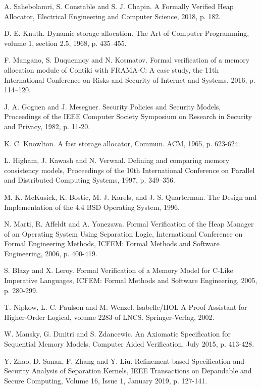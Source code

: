 \documentclass[10pt,conference,compsoc]{IEEEtran}
\begin{document}
\begin{thebibliography}{00}
	A. Sahebolamri, S. Constable and S. J. Chapin. A Formally Verified Heap Allocator, Electrical Engineering and Computer Science, 2018, p. 182.
	
	D. E. Knuth. Dynamic storage allocation. The Art of Computer Programming, volume 1, section 2.5, 1968, p. 435–455.
	
	F. Mangano, S. Duquennoy and N. Kosmatov. Formal verification of a memory allocation module of Contiki with FRAMA-C: A case study, the 11th International Conference on Risks and Security of Internet and Systems, 2016, p. 114–120.
	
	J. A. Goguen and J. Meseguer. Security Policies and Security Models, Proceedings of the IEEE Computer Society Symposium on Research in Security and Privacy, 1982, p. 11-20.
	
	K. C. Knowlton. A fast storage allocator, Commun. ACM, 1965, p. 623-624.
	
	L. Higham, J. Kawash and N. Verwaal. Defining and comparing memory consistency models, Proceedings of the 10th International Conference on Parallel and Distributed Computing Systems, 1997, p. 349–356.
	
	M. K. McKusick, K. Bostic, M. J. Karels, and J. S. Quarterman. The Design and Implementation of the 4.4 BSD Operating System, 1996.
	
	N. Marti, R. Affeldt and A. Yonezawa. Formal Verification of the Heap Manager of an Operating System Using Separation Logic, International Conference on Formal Engineering Methods, ICFEM: Formal Methods and Software Engineering, 2006, p. 400-419.
	
	S. Blazy and X. Leroy. Formal Verification of a Memory Model for C-Like Imperative Languages, ICFEM: Formal Methods and Software Engineering, 2005, p. 280-299.
	
	T. Nipkow, L. C. Paulson and M. Wenzel. Isabelle/HOL-A Proof Assistant for Higher-Order Logical, volume 2283 of LNCS. Springer-Verlag, 2002.
	
	W. Mansky, G. Dmitri and S. Zdancewic. An Axiomatic Specification for Sequential Memory Models, Computer Aided Verification, July 2015, p. 413-428.
	
	Y. Zhao, D. Sanan, F. Zhang and Y. Liu. Refinement-based Specification and Security Analysis of Separation Kernels, IEEE Transactions on Depandable and Secure Computing, Volume 16, Issue 1, January 2019, p. 127-141.
\end{thebibliography}
\end{document}
